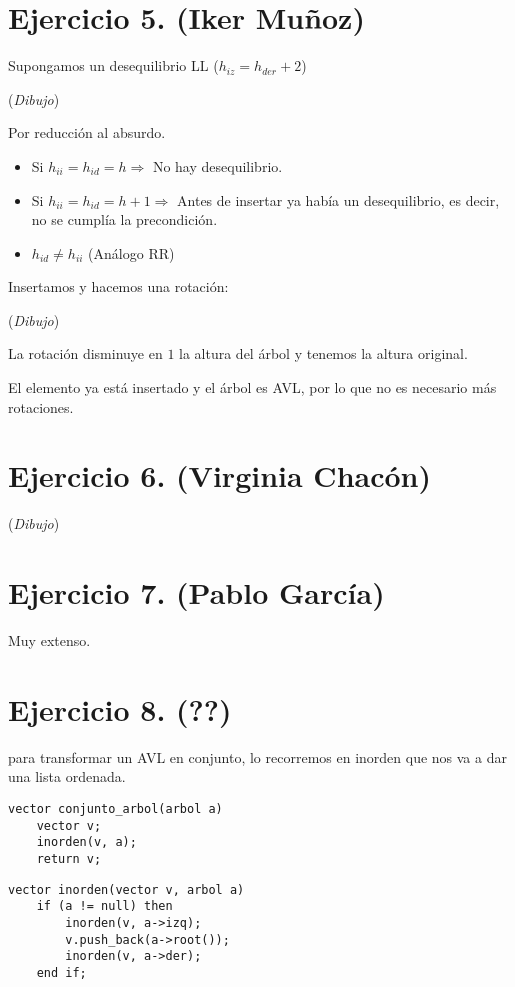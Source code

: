 \documentclass[10pt,a4paper,openright]{book}
\theoremstyle{break}
\begin{document}
\section{Ejercicio 5. (Iker Muñoz)}%
\label{sec:ejercicio_5_iker_munoz_}
Supongamos un desequilibrio LL ($h_{iz} = h_{der} + 2$)

(\textit{Dibujo})

Por reducción al absurdo. 
\begin{itemize}
    \item Si $h_{ii} = h_{id} = h \Rightarrow$ No hay desequilibrio.
    \item Si $h_{ii} = h_{id} = h+1 \Rightarrow$ Antes de insertar ya había un desequilibrio, es decir, no se cumplía la precondición.
    \item $h_{id} \neq h_{ii}$ (Análogo RR)
\end{itemize}

Insertamos y hacemos una rotación:

(\textit{Dibujo}) 

La rotación disminuye en $1$ la altura del árbol y tenemos la altura original. 

El elemento ya está insertado y el árbol es AVL, por lo que no es necesario más rotaciones.

\section{Ejercicio 6. (Virginia Chacón)}%
\label{sec:ejercicio_6_virginia_chacón_}
(\textit{Dibujo}) 

\section{Ejercicio 7. (Pablo García)}%
\label{sec:ejercicio_7_pablo_garcia_}
Muy extenso.

\section{Ejercicio 8. (??)}%
\label{sec:ejercicio_8_}
para transformar un AVL en conjunto, lo recorremos en inorden que nos va a dar una lista ordenada. 

\begin{lstlisting}
vector conjunto_arbol(arbol a) 
    vector v;
    inorden(v, a);
    return v;
\end{lstlisting}

\begin{lstlisting}
vector inorden(vector v, arbol a)
    if (a != null) then
        inorden(v, a->izq);
        v.push_back(a->root());
        inorden(v, a->der);
    end if;
\end{lstlisting}
\end{document}
